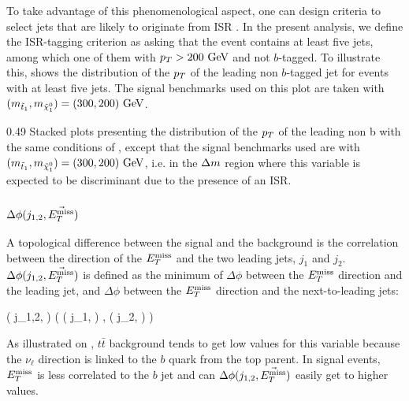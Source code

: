         To take advantage of this phenomenological aspect, one can design criteria to
        select jets that are likely to originate from ISR \cite{ISRGluinoTevatron, ISRtagging}.
        In the present analysis, we define the ISR-tagging criterion as asking that
        the event contains at least five jets, among which one of them with $p_T > 200 ~\text{GeV}$
        and not $b$-tagged. To illustrate this, 
        shows the distribution of the $p_T$ of the leading non $b$-tagged jet for
        events with at least five jets. The signal benchmarks used on this plot are
        taken with $(m_{\tilde{t}_1},m_{\tilde{\chi}_1^0}) = (300,200)~\text{GeV}$.

                     {0.49}
                     {Stacked plots presenting the distribution of the $p_T$
                     of the leading non b
                     with the same conditions of ,
                     except that the signal benchmarks used are with $(m_{\tilde{t}_1},
                     m_{\tilde{\chi}_1^0}) = (300,200)~\text{GeV}$, i.e. in the $\Delta m$ region where
                     this variable is expected to be discriminant due to
                     the presence of an ISR.}

        \subsubsection{$\Delta \phi( j_{1,2}, \vec{E_T^\text{miss}} )$ }

        A topological difference between the signal and the background is the correlation
        between the direction of the $E_T^\text{miss}$ and the two leading jets, $j_1$ and $j_2$.
        $\Delta \phi( j_{1,2}, \vec{E_T^\text{miss}} )$ is defined as the minimum of $\Delta \phi$
        between the $E_T^\text{miss}$ direction and the leading jet, and $\Delta \phi$ between the
        $E_T^\text{miss}$ direction and the next-to-leading jets:

        {
            \Delta \phi( j_{1,2}, \vec{\MET} )
            (
                \Delta \phi( j_1, \vec{\MET} )
                ,
                \Delta \phi( j_2, \vec{\MET} )
            )
        }

        As illustrated on ,
        $t\bar{t}$ background tends to get low values for this variable because the
        $\nu_{\ell}$ direction is linked to the $b$ quark from the top parent. In signal
        events, $E_T^\text{miss}$ is less correlated to the $b$ jet and can $\Delta \phi( j_{1,2},
        \vec{E_T^\text{miss}} )$ easily get to higher values.

